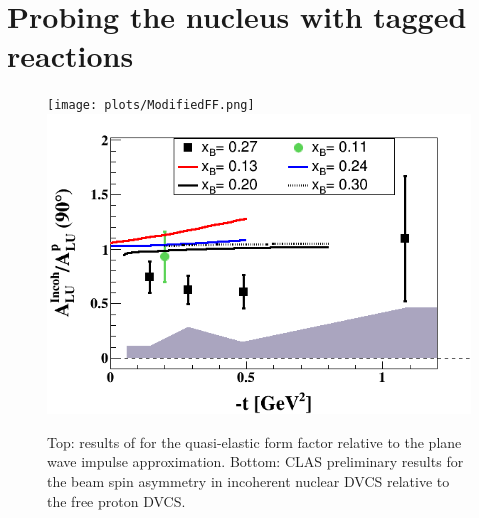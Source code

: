 \section{Probing the nucleus with tagged reactions\label{sec:tagged}} 

\begin{figure}[tbp]
\centering\texttt{[image: plots/ModifiedFF.png]} \\
\centering\includegraphics[width=\columnwidth]{plots/ALU_ratioInc_t_shortscenrario-without-error-onX.png}
\caption{Top: results of \cite{Strauch:2002wu} for the quasi-elastic form factor relative to
the plane wave impulse approximation. Bottom: CLAS preliminary results 
for the beam spin asymmetry in incoherent nuclear DVCS relative to the free proton DVCS.}
\label{fig:QEincoh}
\end{figure}

